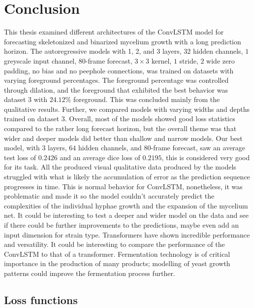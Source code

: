 \documentclass[a4paper,12pt]{article}
\begin{document}
\section{Conclusion}
This thesis examined different architectures of the ConvLSTM model for forecasting skeletonized and binarized mycelium growth with a long prediction horizon. The autoregressive models with 1, 2, and 3 layers, $32$ hidden channels, $1$ greyscale input channel, $80$-frame forecast, $3 \times 3$ kernel, $1$ stride, $2$ wide zero padding, no bias and no peephole connections, was trained on datasets with varying foreground percentages. The foreground percentage was controlled through dilation, and the foreground that exhibited the best behavior was dataset $3$ with $24.12\%$ foreground. This was concluded mainly from the qualitative results.
Further, we compared models with varying widths and depths trained on dataset $3$. Overall, most of the models showed good loss statistics compared to the rather long forecast horizon, but the overall theme was that wider and deeper models did better than shallow and narrow models.
Our best model, with $3$ layers, $64$ hidden channels, and $80$-frame forecast, saw an average test loss of $0.2426$ and an average dice loss of $0.2195$, this is considered very good for its task. All the produced visual qualitative data produced by the models struggled with what is likely the accumulation of error as the prediction sequence progresses in time. This is normal behavior for ConvLSTM, nonetheless, it was problematic and made it so the model couldn't accurately predict the complexities of the individual hyphae growth and the expansion of the mycelium net.
It could be interesting to test a deeper and wider model on the data and see if there could be further improvements to the predictions, maybe even add an input dimension for strain type. Transformers have shown incredible performance and versatility. It could be interesting to compare the performance of the ConvLSTM to that of a transformer.
Fermentation technology is of critical importance in the production of many products; modelling of yeast growth patterns could improve the fermentation process further.




\appendix


\hypertarget{sec:loss}{\subsection{Loss functions}}
\end{document}
